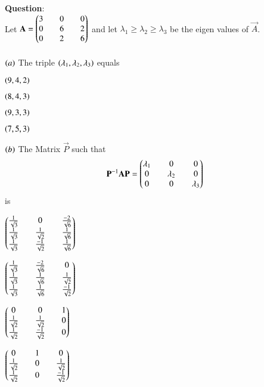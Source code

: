 \documentclass[journal]{IEEEtran}
\begin{document}
\textbf{Question}:\\
Let $\mathbf{A}=\begin{pmatrix}3&&0&&0\\0&&6&&2\\0&&2&&6\end{pmatrix}$ and let $\lambda_1 \geq \lambda_2 \geq \lambda_3$ be the eigen values of $\vec{A}$.\\
\\
$\left(a\right)$ The triple $\left(\lambda_1,\lambda_2,\lambda_3\right)$ equals
\begin{enumerate}
\begin{multicols}{4}
    \item $\left(9,4,2\right)$
    \item $\left(8,4,3\right)$
    \item $\left(9,3,3\right)$
    \item $\left(7,5,3\right)$
\end{multicols}
\end{enumerate}
$\left(b\right)$ The Matrix $\vec{P}$ such that
\begin{align*}
    \mathbf{P}^{-1}\mathbf{A}\mathbf{P}=\begin{pmatrix}\lambda_1&&0&&0\\0&&\lambda_2&&0\\0&&0&&\lambda_3\end{pmatrix}
\end{align*}
is
\begin{enumerate}
\begin{multicols}{2}
    \item $\begin{pmatrix}\frac{1}{\sqrt{3}}&&0&&\frac{-2}{\sqrt{6}}\\\frac{1}{\sqrt{3}}&&\frac{1}{\sqrt{2}}&&\frac{1}{\sqrt{6}}\\\frac{1}{\sqrt{3}}&&\frac{-1}{\sqrt{2}}&&\frac{1}{\sqrt{6}}\end{pmatrix}$
    \item $\begin{pmatrix}\frac{1}{\sqrt{3}}&&\frac{-2}{\sqrt{6}}&&0\\\frac{1}{\sqrt{3}}&&\frac{1}{\sqrt{6}}&&\frac{1}{\sqrt{2}}\\\frac{1}{\sqrt{3}}&&\frac{1}{\sqrt{6}}&&\frac{-1}{\sqrt{2}}\end{pmatrix}$
    \item $\begin{pmatrix}0&&0&&1\\\frac{1}{\sqrt{2}}&&\frac{1}{\sqrt{2}}&&0\\\frac{1}{\sqrt{2}}&&\frac{-1}{\sqrt{2}}&&0\end{pmatrix}$
    \item $\begin{pmatrix}0&&1&&0\\\frac{1}{\sqrt{2}}&&0&&\frac{1}{\sqrt{2}}\\\frac{1}{\sqrt{2}}&&0&&\frac{-1}{\sqrt{2}}\end{pmatrix}$
\end{multicols}
\end{enumerate}
    
\end{document}
